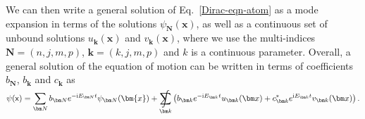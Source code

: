 \documentclass[letterpaper,12pt,titlepage,oneside,final]{book}
\newcommand{\mf}{\mathsf}%
\newcommand{\ii}{\mathrm{i}}
\DeclareMathOperator*{\sumint}{%
\mathchoice%
  {\ooalign{$\displaystyle\sum$\cr\hidewidth$\displaystyle\int$\hidewidth\cr}}
  {\ooalign{\raisebox{.14\height}{\scalebox{.7}{$\textstyle\sum$}}\cr\hidewidth$\textstyle\int$\hidewidth\cr}}
  {\ooalign{\raisebox{.2\height}{\scalebox{.6}{$\scriptstyle\sum$}}\cr$\scriptstyle\int$\cr}}
  {\ooalign{\raisebox{.2\height}{\scalebox{.6}{$\scriptstyle\sum$}}\cr$\scriptstyle\int$\cr}}
}
\begin{document}
We can then write a general solution of Eq.~\eqref{Dirac-eqn-atom} as a mode expansion in terms of the solutions $\psi_{\bm N}(\bm x)$, as well as a continuous set of unbound solutions $u_{\bm k}(\bm x)$ and $v_{\bm k}(\bm x)$, where we use the multi-indices $\bm N = (n,j,m,p)$, $\bm k = (k,j,m,p)$ and $k$ is a continuous parameter. Overall, a general solution of the equation of motion can be written in terms of coefficients $b_{\bm N}$, {${b}_{\bm k}$} and {${c}_{\bm k}$} as
\begin{align}\label{Dirac-solution}
    \psi(\mf x) = \sum_{\bm N} b_{\bm N} e^{-\ii E_{\bm N}t}\psi_{\bm N}(\bm{x})
     + \sumint_{\bm k} \left( b_{\bm k} e^{- \ii E_{\bm k} t} u_{\bm k}(\bm x) + c_{\bm k}^* e^{\ii E_{\bm k} t} v_{\bm k}(\bm x)\right).
\end{align}
\end{document}
